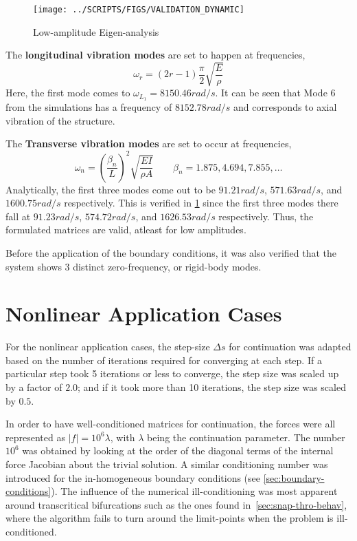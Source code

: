 \documentclass[10pt]{article}
\begin{document}
\begin{figure}[!h]
  \centering
  \texttt{[image: ../SCRIPTS/FIGS/VALIDATION\_DYNAMIC]}
  \caption{Low-amplitude Eigen-analysis}
  \label{fig:lowampeig}
\end{figure}

The \textbf{longitudinal vibration modes} are set to happen at frequencies,
\begin{equation}
  \omega_r = (2r-1)\frac{\pi}{2}\sqrt{\frac{E}{\rho}}
  \label{eq:longmodes}
\end{equation}
Here, the first mode comes to $\omega_{L_1}=8150.46 rad/s$. It can be
seen that Mode 6 from the simulations has a frequency of $8152.78
rad/s$ and corresponds to axial vibration of the structure.

The \textbf{Transverse vibration modes} are set to occur at
frequencies,
\begin{equation}
  \omega_n = {\left(\frac{\beta_n}{L}\right)}^2\sqrt{\frac{EI}{\rho
      A}}\qquad \beta_n=1.875, 4.694, 7.855, \dots
  \label{eq:transmodes}
\end{equation}
Analytically, the first three modes come out to be $91.21 rad/s$,
$571.63 rad/s$, and $1600.75 rad/s$ respectively. This is verified in
\cref{fig:lowampeig} since the first three modes there fall at $91.23
rad/s$, $574.72 rad/s$, and $1626.53 rad/s$ respectively. Thus, the
formulated matrices are valid, atleast for low amplitudes.

Before the application of the boundary conditions, it was also
verified that the system shows 3 distinct zero-frequency, or
rigid-body modes.

\pagebreak
\section{Nonlinear Application Cases}
\label{sec:nonl-appl-cases}

For the nonlinear application cases, the step-size $\Delta s$ for
continuation was adapted based on the number of iterations required
for converging at each step. If a particular step took 5 iterations or
less to converge, the step size was scaled up by a factor of $2.0$;
and if it took more than 10 iterations, the step size was scaled by
$0.5$.

In order to have well-conditioned matrices for continuation, the
forces were all represented as $|f|=10^6\lambda$, with $\lambda$ being
the continuation parameter. The number $10^6$ was obtained by looking
at the order of the diagonal terms of the internal force Jacobian
about the trivial solution. A similar conditioning number was
introduced for the in-homogeneous boundary conditions (see
\cref{sec:boundary-conditions}). The influence of the numerical
ill-conditioning was most apparent around transcritical bifurcations
such as the ones found in~\cref{sec:snap-thro-behav}, where the
algorithm fails to turn around the limit-points when the problem is
ill-conditioned.
\end{document}
